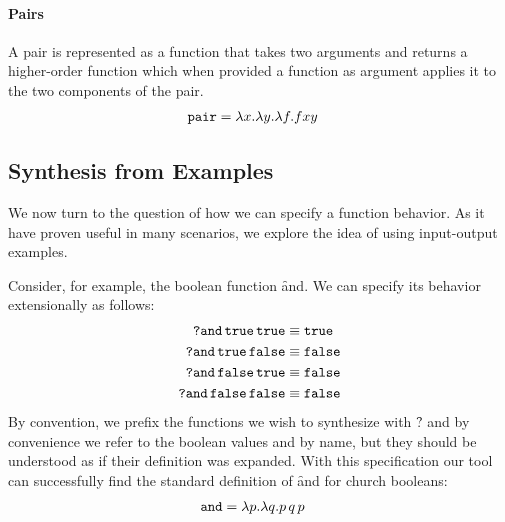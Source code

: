 \paragraph{Pairs}
%
A pair is represented as a function that takes two arguments
and returns a higher-order function which when provided a
function as argument applies it to the two components of the
pair.
%
\begin{align*}
  \texttt{pair} &= \lambda x. \lambda y. \lambda f.f x y
\end{align*}




\subsection{Synthesis from Examples} \label{sec:io}
%
We now turn to the question of how we can specify a function
behavior.
%
As it have proven useful in many scenarios, we explore the
idea of using input-output examples.

Consider, for example, the boolean function \f{and}.
We can specify its behavior extensionally as follows:
%
\begin{align*}
\texttt{?and}\,\texttt{true}\,\texttt{true}    &\equiv \texttt{true} \\
\texttt{?and}\,\texttt{true}\,\texttt{false}   &\equiv \texttt{false} \\
\texttt{?and}\,\texttt{false}\,\texttt{true}   &\equiv \texttt{false} \\
\texttt{?and}\,\texttt{false}\, \texttt{false} &\equiv \texttt{false} \\
\end{align*}
%
By convention, we prefix the functions we wish to synthesize
with \f{?} and by convenience we refer to the boolean values
\true and \false by name, but they should be understood as
if their definition was expanded.
%
With this specification our tool can successfully find the
standard definition of \f{and} for church booleans:
%
\begin{align}
  \label{eq:and-def}
  \texttt{and} &= \lambda p. \lambda q. p\,q\,p
\end{align}


